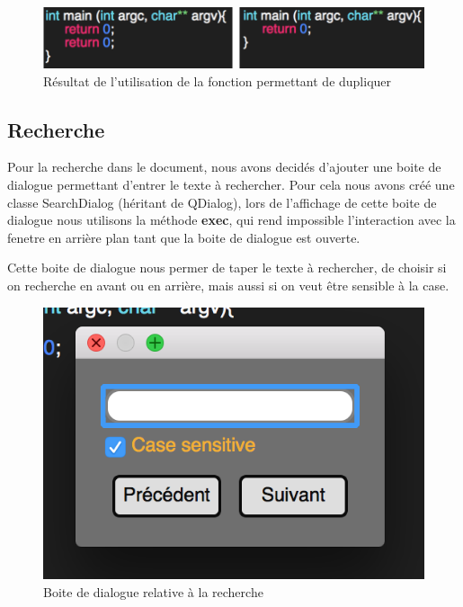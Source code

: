 \documentclass[a4paper,12pt]{article}
\begin{document}
	\begin{figure}[h!]
		\begin{center}
			\includegraphics[scale=0.8]{images/imgs_edit/resultat_duplication}
			\caption{Résultat de l'utilisation de la fonction permettant de dupliquer}
		\end{center}
	\end{figure}

	\newpage
\subsection{Recherche}

	Pour la recherche dans le document, nous avons decidés d'ajouter une boite de dialogue permettant d'entrer le texte à rechercher. Pour cela nous avons créé une classe SearchDialog (héritant de QDialog), lors de l'affichage de cette boite de dialogue nous utilisons la méthode \textbf{exec}, qui rend impossible l'interaction avec la fenetre en arrière plan tant que la boite de dialogue est ouverte.

	Cette boite de dialogue nous permer de taper le texte à rechercher, de choisir si on recherche en avant ou en arrière, mais aussi si on veut être sensible à la case.

	\begin{figure}[h!]
		\begin{center}
			\includegraphics[scale=0.8]{images/imgs_edit/boite_dialog_recherche}
			\caption{Boite de dialogue relative à la recherche}
		\end{center}
	\end{figure}
\end{document}
